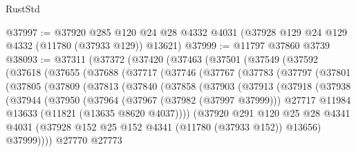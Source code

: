 \begin{lexlean}{RustStd}
\begin{coremodule}
@37997 := @37920
    @285
    @120
    @24
    @28
    @4332
    @4031
    (@37928 @129 @24 @129 @4332 (@11780 (@37933 @129)) @13621)
@37999 := @11797 @37860 @3739
@38093 := @37311
    (@37372
      (@37420
        (@37463
          (@37501
            (@37549
              (@37592
                (@37618
                  (@37655
                    (@37688
                      (@37717
                        (@37746
                          (@37767
                            (@37783
                              (@37797
                                (@37801
                                  (@37805
                                    (@37809
                                      (@37813
                                        (@37840
                                          (@37858
                                            (@37903
                                              (@37913
                                                (@37918
                                                  (@37938
                                                    (@37944
                                                      (@37950
                                                        (@37964
                                                          (@37967 (@37982 (@37997 @37999)))
                                                          @27717
                                                          @11984
                                                          @13633
                                                          (@11821 (@13635 @8620 @4037))))
                                                      (@37920
                                                        @291
                                                        @120
                                                        @25
                                                        @28
                                                        @4341
                                                        @4031
                                                        (@37928
                                                          @152
                                                          @25
                                                          @152
                                                          @4341
                                                          (@11780 (@37933 @152))
                                                          @13656)
                                                        @37999))))
                                                @27770
                                                @27773

\end{coremodule}
\end{lexlean}
